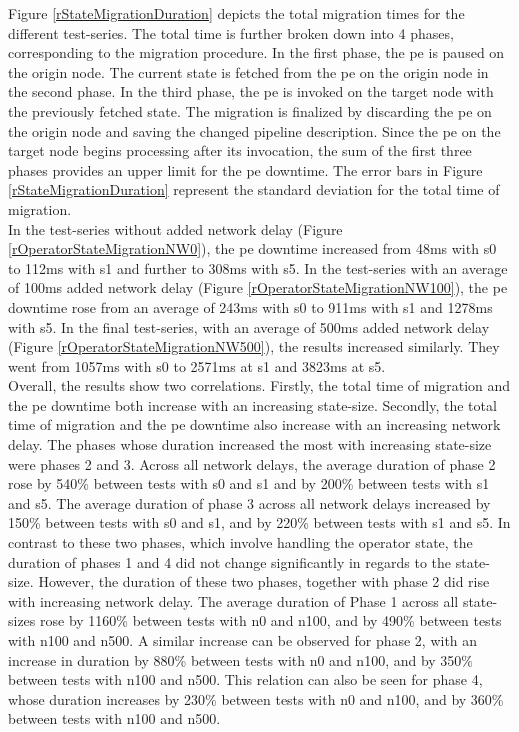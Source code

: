 Figure \ref{rStateMigrationDuration} depicts the total migration times for the different test-series. The total time is further broken down into 4 phases, corresponding to the migration procedure. In the first phase, the \gls{pe} is paused on the origin node. The current state is fetched from the \gls{pe} on the origin node in the second phase. In the third phase, the \gls{pe} is invoked on the target node with the previously fetched state. The migration is finalized by discarding the \gls{pe} on the origin node and saving the changed pipeline description. Since the \gls{pe} on the target node begins processing after its invocation, the sum of the first three phases provides an upper limit for the \gls{pe} downtime. The error bars in Figure \ref{rStateMigrationDuration} represent the standard deviation for the total time of migration.\\ 
In the test-series without added network delay (Figure \ref{rOperatorStateMigrationNW0}), the \gls{pe} downtime increased from 48ms with s0 to 112ms with s1 and further to 308ms with s5. In the test-series with an average of 100ms added network delay (Figure \ref{rOperatorStateMigrationNW100}), the \gls{pe} downtime rose from an average of 243ms with s0 to 911ms with s1 and 1278ms with s5. In the final test-series, with an average of 500ms added network delay (Figure \ref{rOperatorStateMigrationNW500}), the results increased similarly. They went from 1057ms with s0 to 2571ms at s1 and 3823ms at s5.\\
Overall, the results show two correlations. Firstly, the total time of migration and the \gls{pe} downtime both increase with an increasing state-size. Secondly, the total time of migration and the \gls{pe} downtime also increase with an increasing network delay. The phases whose duration increased the most with increasing state-size were phases 2 and 3. Across all network delays, the average duration of phase 2 rose by 540\% between tests with s0 and s1 and by 200\% between tests with s1 and s5. The average duration of phase 3 across all network delays increased by 150\% between tests with s0 and s1, and by 220\% between tests with s1 and s5. In contrast to these two phases, which involve handling the operator state, the duration of phases 1 and 4 did not change significantly in regards to the state-size. However, the duration of these two phases, together with phase 2 did rise with increasing network delay. The average duration of Phase 1 across all state-sizes rose by 1160\% between tests with n0 and n100, and by 490\% between tests with n100 and n500. A similar increase can be observed for phase 2, with an increase in duration by 880\% between tests with n0 and n100, and by 350\% between tests with n100 and n500. This relation can also be seen for phase 4, whose duration increases by 230\% between tests with n0 and n100, and by 360\% between tests with n100 and n500.\par

